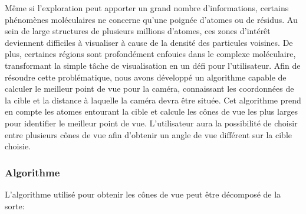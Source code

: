 Même si l'exploration peut apporter un grand nombre d'informations, certains phénomènes moléculaires ne concerne qu'une poignée d'atomes ou de résidus. Au sein de large structures de plusieurs millions d'atomes, ces zones d'intérêt deviennent difficiles à visualiser à cause de la densité des particules voisines. De plus, certaines régions sont profondément enfouies dans le complexe moléculaire, transformant la simple tâche de visualisation en un défi pour l'utilisateur. Afin de résoudre cette problématique, nous avons développé un algorithme capable de calculer le meilleur point de vue pour la caméra, connaissant les coordonnées de la cible et la distance à laquelle la caméra devra être située. Cet algorithme prend en compte les atomes entourant la cible et calcule les cônes de vue les plus larges pour identifier le meilleur point de vue. L'utilisateur aura la possibilité de choisir entre plusieurs cônes de vue afin d'obtenir un angle de vue différent sur la cible choisie.

\subsubsection{Algorithme}

L'algorithme utilisé pour obtenir les cônes de vue peut être décomposé de la sorte:

